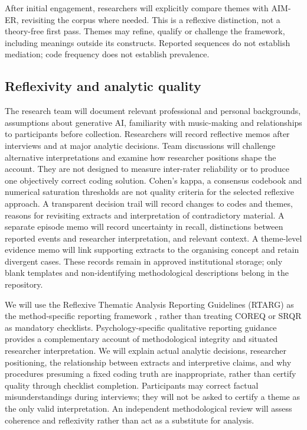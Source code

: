 After initial engagement, researchers will explicitly compare themes with AIM-ER, revisiting the corpus where needed. This is a reflexive distinction, not a theory-free first pass. Themes may refine, qualify or challenge the framework, including meanings outside its constructs. Reported sequences do not establish mediation; code frequency does not establish prevalence.

\subsection{Reflexivity and analytic quality}
The research team will document relevant professional and personal backgrounds, assumptions about generative AI, familiarity with music-making and relationships to participants before collection. Researchers will record reflective memos after interviews and at major analytic decisions. Team discussions will challenge alternative interpretations and examine how researcher positions shape the account. They are not designed to measure inter-rater reliability or to produce one objectively correct coding solution. Cohen's kappa, a consensus codebook and numerical saturation thresholds are not quality criteria for the selected reflexive approach. A transparent decision trail will record changes to codes and themes, reasons for revisiting extracts and interpretation of contradictory material. A separate episode memo will record uncertainty in recall, distinctions between reported events and researcher interpretation, and relevant context. A theme-level evidence memo will link supporting extracts to the organising concept and retain divergent cases. These records remain in approved institutional storage; only blank templates and non-identifying methodological descriptions belong in the repository.

We will use the Reflexive Thematic Analysis Reporting Guidelines (RTARG) as the method-specific reporting framework \citep{rtarg2024}, rather than treating COREQ or SRQR \citep{tong2007,obrien2014} as mandatory checklists. Psychology-specific qualitative reporting guidance \citep{levitt2018} provides a complementary account of methodological integrity and situated researcher interpretation. We will explain actual analytic decisions, researcher positioning, the relationship between extracts and interpretive claims, and why procedures presuming a fixed coding truth are inappropriate, rather than certify quality through checklist completion. Participants may correct factual misunderstandings during interviews; they will not be asked to certify a theme as the only valid interpretation. An independent methodological review will assess coherence and reflexivity rather than act as a substitute for analysis.

